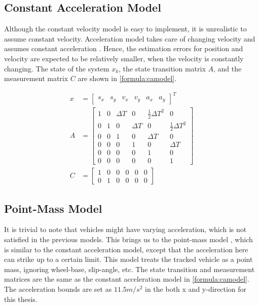 \subsection{Constant Acceleration Model}
Although the constant velocity model is easy to implement, it is unrealistic to assume constant velocity. Acceleration model takes care of changing velocity and assumes constant acceleration \cite{Schubert2008}. Hence, the estimation errors for position and velocity are expected to be relatively smaller, when the velocity is constantly changing. The state of the system $x_k$, the state transition matrix $A$, and the measurement matrix $C$ are shown in \eqref{formula:camodel}.

\begin{equation}
\label{formula:camodel}
\begin{split}
x&= \left[\begin{matrix}
s_x & s_y & v_x & v_y & a_x & a_y
\end{matrix}\right]^{T}\\
A&= \left[\begin{matrix}
1 & 0 & \Delta T & 0 & \frac{1}{2}\Delta T^2 & 0\\
0 & 1 & 0 & \Delta T & 0 & \frac{1}{2}\Delta T^2 \\
0 & 0 & 1 & 0 & \Delta T & 0\\
0 & 0 & 0 & 1 & 0 & \Delta T\\
0 & 0 & 0 & 0 & 1 & 0\\
0 & 0 & 0 & 0 & 0 & 1
\end{matrix}\right] \\
C&= \left[\begin{matrix}
1 & 0 & 0 & 0 & 0 & 0\\
0 & 1 & 0 & 0 & 0 & 0
\end{matrix}\right]
\end{split}
\end{equation}

\subsection{Point-Mass Model}
It is trivial to note that vehicles might have varying acceleration, which is not satisfied in the previous models. This brings us to the point-mass model \cite{Althoff}, which is similar to the constant acceleration model, except that the acceleration here can strike up to a certain limit. This model treats the tracked vehicle as a point mass, ignoring wheel-base, slip-angle, etc. The state transition and measurement matrices are the same as the constant acceleration model in \eqref{formula:camodel}. The acceleration bounds are set as $11.5 m/s^2$ \cite{Althoff} in the both x and y-direction for this thesis.

